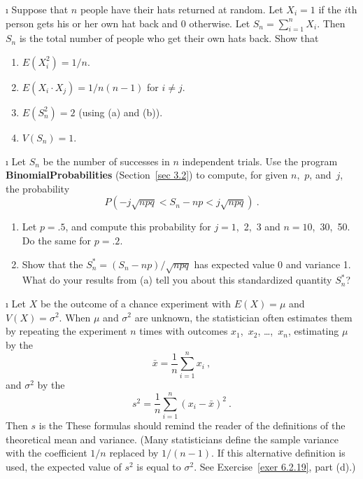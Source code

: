 \begin{LJSItem}
\i\label{exer 6.2.16} Suppose that $n$ people have their hats returned at random. 
Let
$X_i = 1$ if the $i$th person gets his or her own hat back and 0 otherwise.  Let
$S_n =
\sum_{i = 1}^n X_i$.  Then $S_n$ is the total number of people who get their own hats
back.  Show that
\begin{enumerate}
\item $E(X_i^2) = 1/n$.

\item $E(X_i \cdot X_j) = 1/n(n - 1)$ for $i \ne j$.

\item $E(S_n^2) = 2$ (using (a) and (b)).

\item $V(S_n) = 1$.
\end{enumerate}

\i\label{exer 6.2.17} Let $S_n$ be the number of successes in $n$ independent
trials.  Use the program {\bf BinomialProbabilities} (Section~\ref{sec 3.2}) to compute,
for given $n$,~$p$, and~$j$, the probability
$$ P(-j\sqrt{npq} < S_n - np < j\sqrt{npq})\ .
$$
\begin{enumerate}
\item Let $p = .5$, and compute this probability for $j = 1$,~2,~3 and $n =
10$,~30,~50.  Do the same for $p = .2$.

\item Show that the   $S_n^* = (S_n -
np)/\sqrt{npq}$ has expected value 0 and variance 1.  What do your results from (a)
tell you about this standardized quantity $S_n^*$?
\end{enumerate}

\i\label{exer 6.2.18} Let $X$ be the outcome of a chance experiment with $E(X) =
\mu$ and $V(X) = \sigma^2$.  When $\mu$ and $\sigma^2$ are unknown, the statistician
often estimates them by repeating the experiment $n$ times with outcomes
$x_1$,~$x_2$, \dots,~$x_n$, estimating $\mu$ by the  
$$
\bar{x} = \frac 1n \sum_{i = 1}^n x_i\ ,
$$ and $\sigma^2$ by the  
$$ s^2 = \frac 1n \sum_{i = 1}^n (x_i - \bar x)^2\ .
$$ Then $s$ is the    These formulas
should remind the reader of the definitions of the theoretical mean and variance.  (Many
statisticians define the sample variance with the coefficient $1/n$ replaced by
$1/(n-1)$.  If this alternative definition is used, the expected value of $s^2$ is equal to $\sigma^2$. See
Exercise~\ref{exer 6.2.19}, part (d).)


\end{LJSItem}
